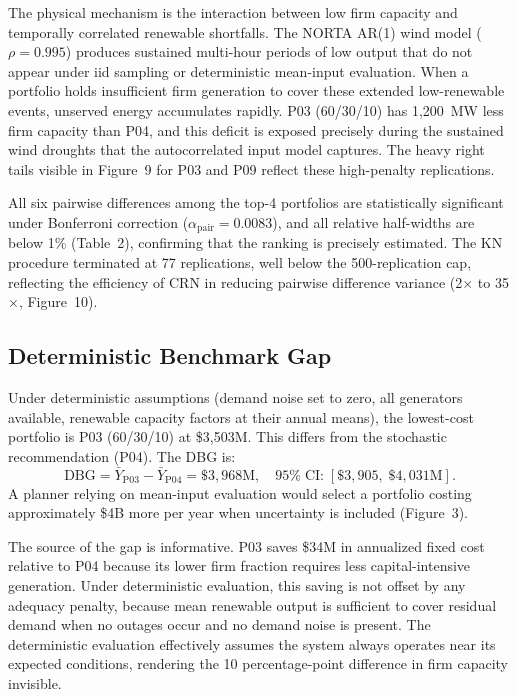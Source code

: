 \documentclass[11pt]{article}
\begin{document}
The physical mechanism is the interaction between low firm capacity and temporally correlated
renewable shortfalls. The NORTA AR(1) wind model ($\rho = 0.995$) produces sustained
multi-hour periods of low output that do not appear under iid sampling or deterministic
mean-input evaluation. When a portfolio holds insufficient firm generation to cover these
extended low-renewable events, unserved energy accumulates rapidly. P03 (60/30/10) has
1,200~MW less firm capacity than P04, and this deficit is exposed precisely during the
sustained wind droughts that the autocorrelated input model captures. The heavy right tails
visible in Figure~9 for P03 and P09 reflect these high-penalty replications.

All six pairwise differences among the top-4 portfolios are statistically significant under
Bonferroni correction ($\alpha_{\text{pair}} = 0.0083$), and all relative half-widths are
below 1\% (Table~2), confirming that the ranking is precisely estimated. The KN procedure
terminated at 77 replications, well below the 500-replication cap, reflecting the efficiency
of CRN in reducing pairwise difference variance (2$\times$ to 35$\times$, Figure~10).


\subsection{Deterministic Benchmark Gap}
Under deterministic assumptions (demand noise set to zero, all generators available, renewable
capacity factors at their annual means), the lowest-cost portfolio is P03 (60/30/10) at
\$3,503M. This differs from the stochastic recommendation (P04). The DBG is:
%
\begin{equation}\label{eq:dbg}
  \text{DBG} = \bar{Y}_{\text{P03}} - \bar{Y}_{\text{P04}} = \$3{,}968\text{M}, \quad 95\%\;\text{CI:}\; [\$3{,}905,\; \$4{,}031\text{M}].
\end{equation}
A planner relying on mean-input evaluation would select a portfolio costing approximately
\$4B more per year when uncertainty is included (Figure~3).

The source of the gap is informative. P03 saves \$34M in annualized fixed cost relative to P04
because its lower firm fraction requires less capital-intensive generation. Under deterministic
evaluation, this saving is not offset by any adequacy penalty, because mean renewable output is
sufficient to cover residual demand when no outages occur and no demand noise is present. The
deterministic evaluation effectively assumes the system always operates near its expected
conditions, rendering the 10 percentage-point difference in firm capacity invisible.
\end{document}
